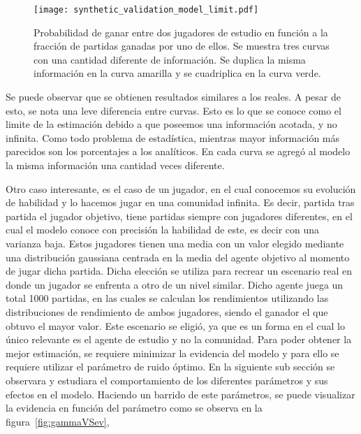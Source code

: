 \documentclass[11pt,twoside,spanish]{report} %
\begin{document}
 \begin{figure}[H]
	\centering
	\texttt{[image: synthetic\_validation\_model\_limit.pdf]}
	\caption{Probabilidad de ganar entre dos jugadores de estudio en funci\'on a la fracci\'on de partidas ganadas por uno de ellos. Se muestra tres curvas con una cantidad diferente de informaci\'on. Se duplica la misma informaci\'on en la curva amarilla y se cuadriplica en la curva verde.}
	\label{fig:limite}
\end{figure}

Se puede observar que se obtienen resultados similares a los reales.
A pesar de esto, se nota una leve diferencia entre curvas. Esto es lo que se conoce como el limite de la estimaci\'on debido a que poseemos una informaci\'on acotada, y no infinita.
Como todo problema de estad\'istica, mientras mayor informaci\'on m\'as parecidos son los porcentajes a los anal\'iticos.
En cada curva se agreg\'o al modelo la misma informaci\'on una cantidad veces diferente.



Otro caso interesante, es el caso de un jugador, en el cual conocemos su evoluci\'on de habilidad y lo hacemos jugar en una comunidad infinita.
Es decir, partida tras partida el jugador objetivo, tiene partidas siempre con jugadores diferentes, en el cual el modelo conoce con precisi\'on la habilidad de este, es decir con una varianza baja.
Estos jugadores tienen una media con un valor elegido mediante una distribuci\'on gaussiana centrada en la media del agente objetivo al momento de jugar dicha partida.
Dicha elecci\'on se utiliza para recrear un escenario real en donde un jugador se enfrenta a otro de un nivel similar.
Dicho agente juega un total 1000 partidas, en las cuales se calculan los rendimientos utilizando las distribuciones de rendimiento de ambos jugadores, siendo el ganador el que obtuvo el mayor valor.
Este escenario se eligi\'o, ya que es un forma en el cual lo \'unico relevante es el agente de estudio y no la comunidad.
Para poder obtener la mejor estimaci\'on, se requiere minimizar la evidencia del modelo y para ello se requiere utilizar el par\'ametro de ruido \'optimo.
En la siguiente sub secci\'on se observara y estudiara el comportamiento de los diferentes par\'ametros y sus efectos en el modelo.
Haciendo un barrido de este par\'ametros, se puede visualizar la evidencia en funci\'on del par\'ametro como se observa en la figura~\ref{fig:gammaVSev},
\end{document}

